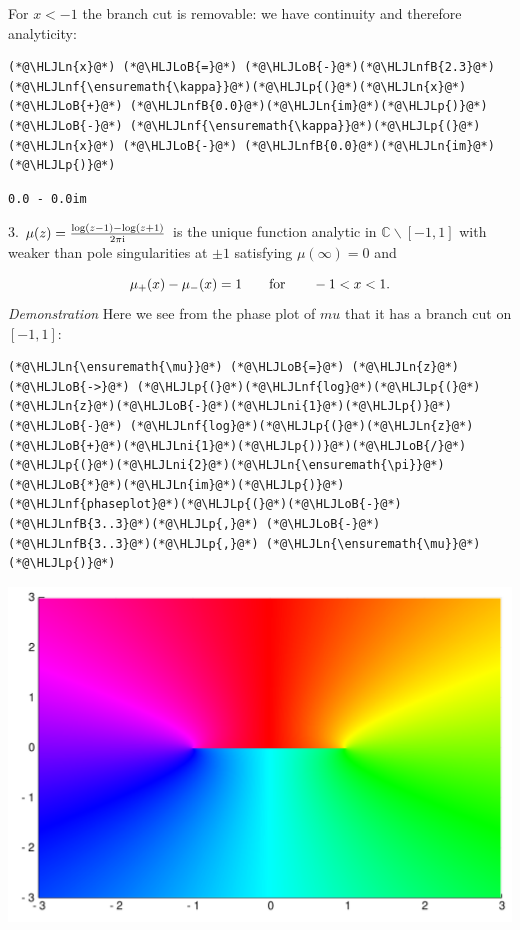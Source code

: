\documentclass[12pt,a4paper]{article}
\newcommand{\HLJLn}[1]{#1}
\newcommand{\HLJLnf}[1]{\textcolor[RGB]{66,102,213}{#1}}
\newcommand{\HLJLnfB}[1]{\textcolor[RGB]{59,151,46}{#1}}
\newcommand{\HLJLni}[1]{\textcolor[RGB]{59,151,46}{#1}}
\newcommand{\HLJLoB}[1]{\textcolor[RGB]{102,102,102}{\textbf{#1}}}
\newcommand{\HLJLp}[1]{#1}
\def\qqfor{\qquad\hbox{for}\qquad}
\def\I{ {\rm i} }
\def\C{ {\mathbb C} }
\def\qqfor{\qquad\hbox{for}\qquad}
\begin{document}
For $x < -1$ the branch cut is removable: we have continuity and therefore analyticity:


\begin{lstlisting}
(*@\HLJLn{x}@*) (*@\HLJLoB{=}@*) (*@\HLJLoB{-}@*)(*@\HLJLnfB{2.3}@*)
(*@\HLJLnf{\ensuremath{\kappa}}@*)(*@\HLJLp{(}@*)(*@\HLJLn{x}@*) (*@\HLJLoB{+}@*) (*@\HLJLnfB{0.0}@*)(*@\HLJLn{im}@*)(*@\HLJLp{)}@*) (*@\HLJLoB{-}@*) (*@\HLJLnf{\ensuremath{\kappa}}@*)(*@\HLJLp{(}@*)(*@\HLJLn{x}@*) (*@\HLJLoB{-}@*) (*@\HLJLnfB{0.0}@*)(*@\HLJLn{im}@*)(*@\HLJLp{)}@*)
\end{lstlisting}

\begin{lstlisting}
0.0 - 0.0im
\end{lstlisting}


3. $\mu(z) = {\log(z -1) - \log(z+1) \over 2 \pi \I}$ is the unique function analytic in $\C \backslash [-1,1]$ with weaker than pole singularities at $\pm 1$ satisfying $\mu(\infty) = 0$ and 

\[
\mu_+(x) - \mu_-(x) = 1 \qqfor -1 < x < 1.
\]
\emph{Demonstration} Here we see from the phase plot of $mu$ that it has a branch cut on $[-1,1]$:


\begin{lstlisting}
(*@\HLJLn{\ensuremath{\mu}}@*) (*@\HLJLoB{=}@*) (*@\HLJLn{z}@*) (*@\HLJLoB{->}@*) (*@\HLJLp{(}@*)(*@\HLJLnf{log}@*)(*@\HLJLp{(}@*)(*@\HLJLn{z}@*)(*@\HLJLoB{-}@*)(*@\HLJLni{1}@*)(*@\HLJLp{)}@*) (*@\HLJLoB{-}@*) (*@\HLJLnf{log}@*)(*@\HLJLp{(}@*)(*@\HLJLn{z}@*)(*@\HLJLoB{+}@*)(*@\HLJLni{1}@*)(*@\HLJLp{))}@*)(*@\HLJLoB{/}@*)(*@\HLJLp{(}@*)(*@\HLJLni{2}@*)(*@\HLJLn{\ensuremath{\pi}}@*)(*@\HLJLoB{*}@*)(*@\HLJLn{im}@*)(*@\HLJLp{)}@*)
(*@\HLJLnf{phaseplot}@*)(*@\HLJLp{(}@*)(*@\HLJLoB{-}@*)(*@\HLJLnfB{3..3}@*)(*@\HLJLp{,}@*) (*@\HLJLoB{-}@*)(*@\HLJLnfB{3..3}@*)(*@\HLJLp{,}@*) (*@\HLJLn{\ensuremath{\mu}}@*)(*@\HLJLp{)}@*)
\end{lstlisting}

\includegraphics[width=\linewidth]{figures/Lecture12_10_1.pdf}
\end{document}
